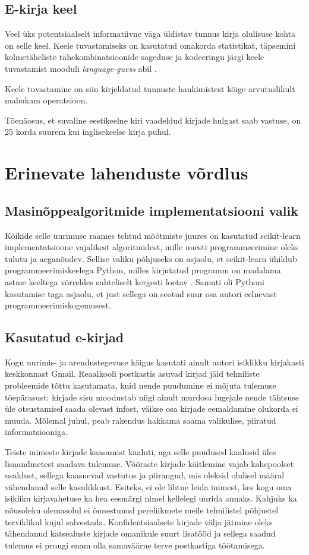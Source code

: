 \documentclass[]{trkuur}
\let\eng\emph
\let\enp\eng
\begin{document}
\section{E-kirja keel}
Veel üks potentsiaalselt informatiivne väga üldistav tunnus kirja olulisuse
kohta on selle keel. Keele tuvastamiseks on kasutatud omakorda statistikat,
täpsemini kolmetäheliste tähekombinatsioonide sageduse ja kodeeringu järgi
keele tuvastamist mooduli \enp{language-guess} abil
\autocite{GuessLanguegePYPI}.

Keele tuvastamine on siin kirjeldatud tunnuste hankimistest kõige
arvutuslikult mahukam operatsioon. 

Tõenäosus, et suvaline eestikeelne kiri vaadeldud kirjade hulgast saab vastuse,
on 25 korda suurem kui inglisekeelse kirja puhul.

\chapter{Erinevate lahenduste võrdlus}
\section{Masinõppealgoritmide implementatsiooni valik}
Kõikide selle uurimuse raames tehtud mõõtmiste juures on kasutatud scikit-learn
implementatsioone vajalikest algoritmidest, mille uuesti programmeerimine oleks
tulutu ja aeganõudev. Sellise valiku põhjuseks on asjaolu, et scikit-learn
ühildub programmeerimiskeelega Python, milles kirjutatud programm on madalama
astme keeltega võrreldes suhteliselt
kergesti loetav \autocite{wiki-python-programming-language}. Samuti oli Pythoni
kasutamise taga asjaolu, et just sellega on seotud suur osa autori eelnevast
programmeerimiskogemusest.

\section{Kasutatud e-kirjad}
Kogu uurimis- ja arendustegevuse käigus kasutati ainult autori isiklikku
kirjakasti keskkonnast Gmail. Reaalkooli postkastis asuvad kirjad jäid
tehniliste probleemide tõttu kasutamata, kuid nende puudumine ei mõjuta
tulemuse tõepärasust: kirjade sisu moodustab niigi ainult murdosa lugejale
nende tähtsuse üle otsustamisel saada olevast infost, väikse osa kirjade
eemaldamine olukorda ei muuda. Mõlemal juhul, peab rakendus hakkama saama
valikulise, piiratud informatsiooniga.

Teiste inimeste kirjade kaasamist
kaaluti, aga selle puudused kaalusid üles lisaandmetest saadava tulemuse.
Võõraste kirjade käitlemine vajab kahepoolset usaldust, sellega kaasnevad
vastutus ja piirangud, mis oleksid olulisel määral vähendanud selle
kasulikkust. Esiteks, ei ole lihtne leida inimest, kes kogu oma isikliku
kirjavahetuse ka hea eesmärgi nimel kellelegi uurida annaks. Kahjuks
ka nõusoleku olemasolul ei õnnestunud pereliikmete meile tehnilistel
põhjustel terviklikul kujul salvestada. Konfidentsiaalsete kirjade välja
jätmine oleks tähendanud katsealuste kirjade omanikule suurt lisatööd ja
sellega saadud tulemus ei pruugi enam olla samaväärne terve postkastiga
töötamisega.
\end{document}
